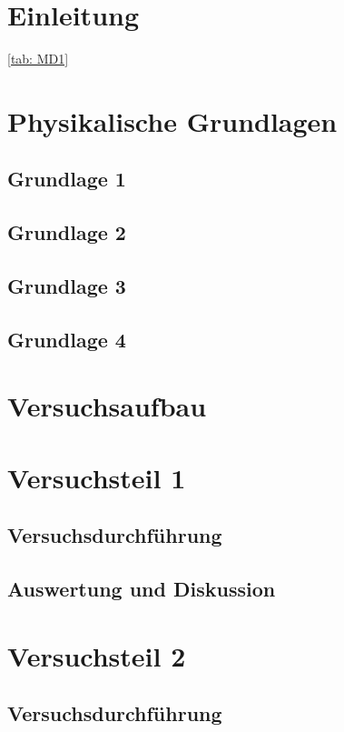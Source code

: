 \documentclass{Praktikum}
\begin{document}
\section{Einleitung}
\lipsum[2]
\cite{zombo}
\ref{tab: MD1}

\section{Physikalische Grundlagen}
\subsection{Grundlage 1}
\lipsum[1-3]

\subsection{Grundlage 2}
\lipsum[1-3]

\subsection{Grundlage 3}
\lipsum[1-3]

\subsection{Grundlage 4}
\lipsum[1-3]

\newpage
\section{Versuchsaufbau}
\lipsum[4]

\section{Versuchsteil 1}
\subsection{Versuchsdurchführung}
\lipsum[4]

\subsection{Auswertung und Diskussion}
\lipsum[2-3]

\section{Versuchsteil 2}
\subsection{Versuchsdurchführung}
\lipsum[4]
\end{document}
